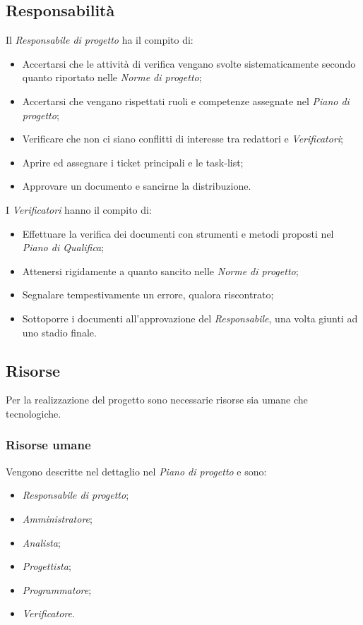 \documentclass[a4paper]{article}
\begin{document}
		\subsection{Responsabilità}
			Il \emph{Responsabile di progetto} ha il compito di:
			\begin{itemize}
				\item Accertarsi che le attività di verifica vengano svolte sistematicamente secondo quanto 
				riportato nelle \emph{Norme di progetto};
				\item Accertarsi che vengano rispettati ruoli e competenze assegnate nel \emph{Piano di progetto};
				\item Verificare che non ci siano conflitti di interesse tra redattori e \emph{Verificatori};
				\item Aprire ed assegnare i ticket principali e le task-list;
				\item Approvare un documento e sancirne la distribuzione.
			\end{itemize}
			I \emph{Verificatori} hanno il compito di:
			\begin{itemize}
				\item Effettuare la verifica dei documenti con strumenti e metodi proposti nel \emph{Piano di Qualifica};
				\item Attenersi rigidamente a quanto sancito nelle \emph{Norme di progetto};
				\item Segnalare tempestivamente un errore, qualora riscontrato;
				\item Sottoporre i documenti all'approvazione del \emph{Responsabile}, una volta giunti ad uno stadio finale.
			\end{itemize}
		\subsection{Risorse}
			Per la realizzazione del progetto sono necessarie risorse sia umane che tecnologiche.
			\subsubsection{Risorse umane}
				Vengono descritte nel dettaglio nel \emph{Piano di progetto} e sono:
				\begin{itemize}
					\item \emph{Responsabile di progetto};
					\item \emph{Amministratore};
					\item \emph{Analista};
					\item \emph{Progettista};
					\item \emph{Programmatore};
					\item \emph{Verificatore}.
				\end{itemize}
\end{document}
